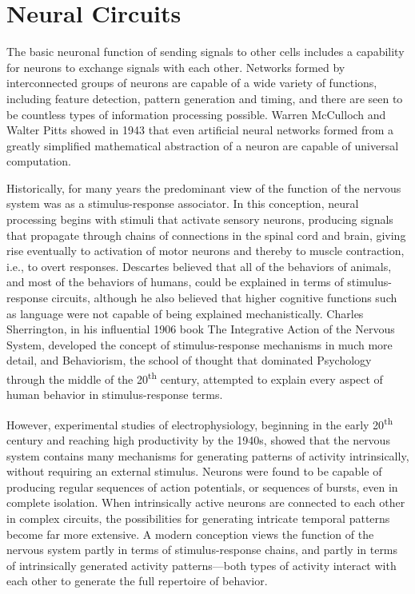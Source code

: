 \hypertarget{neural-circuits}{%
\section{Neural Circuits}\label{neural-circuits}}

The basic neuronal function of sending signals to other cells includes a capability for neurons to exchange signals with each other. Networks formed by interconnected groups of neurons are capable of a wide variety of functions, including feature detection, pattern generation and timing, and there are seen to be countless types of information processing possible. Warren McCulloch and Walter Pitts showed in 1943 that even artificial neural networks formed from a greatly simplified mathematical abstraction of a neuron are capable of universal computation.

Historically, for many years the predominant view of the function of the nervous system was as a stimulus-response associator. In this conception, neural processing begins with stimuli that activate sensory neurons, producing signals that propagate through chains of connections in the spinal cord and brain, giving rise eventually to activation of motor neurons and thereby to muscle contraction, i.e., to overt responses. Descartes believed that all of the behaviors of animals, and most of the behaviors of humans, could be explained in terms of stimulus-response circuits, although he also believed that higher cognitive functions such as language were not capable of being explained mechanistically. Charles Sherrington, in his influential 1906 book The Integrative Action of the Nervous System, developed the concept of stimulus-response mechanisms in much more detail, and Behaviorism, the school of thought that dominated Psychology through the middle of the 20\textsuperscript{th} century, attempted to explain every aspect of human behavior in stimulus-response terms.

However, experimental studies of electrophysiology, beginning in the early 20\textsuperscript{th} century and reaching high productivity by the 1940s, showed that the nervous system contains many mechanisms for generating patterns of activity intrinsically, without requiring an external stimulus. Neurons were found to be capable of producing regular sequences of action potentials, or sequences of bursts, even in complete isolation. When intrinsically active neurons are connected to each other in complex circuits, the possibilities for generating intricate temporal patterns become far more extensive. A modern conception views the function of the nervous system partly in terms of stimulus-response chains, and partly in terms of intrinsically generated activity patterns---both types of activity interact with each other to generate the full repertoire of behavior.

